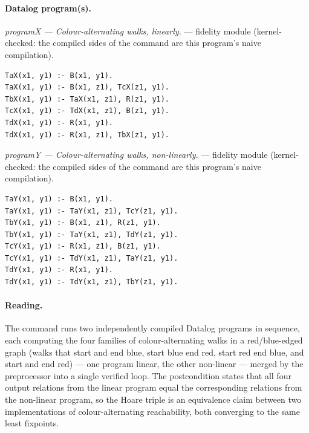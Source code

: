 \documentclass[10pt]{article}
\begin{document}
\paragraph{Datalog program(s).}

{\raggedright\textit{programX --- Colour-alternating walks, linearly.} --- fidelity module (kernel-checked: the compiled sides of the command are this program's naive compilation).\par}

\begin{Verbatim}[fontsize=\scriptsize,breaklines=true,breakanywhere=true,frame=single,framesep=1.5mm]
TaX(x1, y1) :- B(x1, y1).
TaX(x1, y1) :- B(x1, z1), TcX(z1, y1).
TbX(x1, y1) :- TaX(x1, z1), R(z1, y1).
TcX(x1, y1) :- TdX(x1, z1), B(z1, y1).
TdX(x1, y1) :- R(x1, y1).
TdX(x1, y1) :- R(x1, z1), TbX(z1, y1).
\end{Verbatim}

{\raggedright\textit{programY --- Colour-alternating walks, non-linearly.} --- fidelity module (kernel-checked: the compiled sides of the command are this program's naive compilation).\par}

\begin{Verbatim}[fontsize=\scriptsize,breaklines=true,breakanywhere=true,frame=single,framesep=1.5mm]
TaY(x1, y1) :- B(x1, y1).
TaY(x1, y1) :- TaY(x1, z1), TcY(z1, y1).
TbY(x1, y1) :- B(x1, z1), R(z1, y1).
TbY(x1, y1) :- TaY(x1, z1), TdY(z1, y1).
TcY(x1, y1) :- R(x1, z1), B(z1, y1).
TcY(x1, y1) :- TdY(x1, z1), TaY(z1, y1).
TdY(x1, y1) :- R(x1, y1).
TdY(x1, y1) :- TdY(x1, z1), TbY(z1, y1).
\end{Verbatim}

\paragraph{Reading.} The command runs two independently compiled Datalog programs in sequence, each computing the four families of colour-alternating walks in a red/blue-edged graph (walks that start and end blue, start blue end red, start red end blue, and start and end red) --- one program linear, the other non-linear --- merged by the preprocessor into a single verified loop. The postcondition states that all four output relations from the linear program equal the corresponding relations from the non-linear program, so the Hoare triple is an equivalence claim between two implementations of colour-alternating reachability, both converging to the same least fixpoints.
\end{document}
